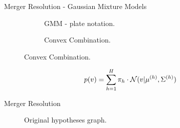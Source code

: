 
\begin{frame}{Merger Resolution - Gaussian Mixture Models}
    \begin{figure}
        \centering
        \begin{subfigure}[b]{0.44\textwidth}
            \centering
            \scalebox{0.74}{
                
            }
            \caption{GMM - plate notation.}
        \end{subfigure}
        \hfill
        \begin{subfigure}[b]{0.44\textwidth}
            \centering
            \scalebox{0.65}{
                
            }
            \caption{Convex Combination.}
        \end{subfigure}
        \label{fig:conservation-gmm}
    \end{figure}
    \begin{align*}
        p(v) = \sum_{h=1}^H\pi_h\cdot\mathcal{N}({v}|\mathbf{\mu }^{(h)} , {\Sigma }^{(h)} )
    \end{align*}
\end{frame}

\begin{frame}{Merger Resolution}
    \begin{figure}
        \centering
        \scalebox{0.7}{
            \begin{tikzpicture}[minimum size=58pt,scale=0.45, every node/.style={scale=0.45, font=\LARGE}, thick]
                
            \end{tikzpicture}
        }
        \caption{Original hypotheses graph.}
        \label{fig:conservation-hyp-inferred}
    \end{figure}
\end{frame}


